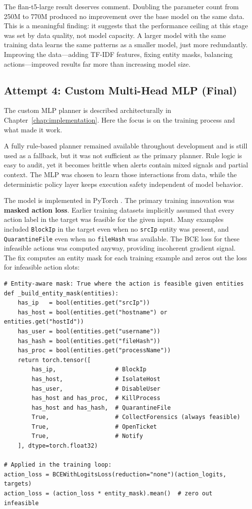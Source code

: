 The flan-t5-large result deserves comment. Doubling the parameter count from 250M to 770M produced no improvement over the base model on the same data. This is a meaningful finding: it suggests that the performance ceiling at this stage was set by data quality, not model capacity. A larger model with the same training data learns the same patterns as a smaller model, just more redundantly. Improving the data---adding TF-IDF features, fixing entity masks, balancing actions---improved results far more than increasing model size.

\subsection{Attempt 4: Custom Multi-Head MLP (Final)}

The custom MLP planner is described architecturally in Chapter~\ref{chap:implementation}. Here the focus is on the training process and what made it work.

A fully rule-based planner remained available throughout development and is still used as
a fallback, but it was not sufficient as the primary planner. Rule logic is easy to
audit, yet it becomes brittle when alerts contain mixed signals and partial context. The
MLP was chosen to learn those interactions from data, while the deterministic policy layer
keeps execution safety independent of model behavior.

The model is implemented in PyTorch \cite{paszke2019pytorch}. The primary training innovation was \textbf{masked action loss}. Earlier training datasets implicitly assumed that every action label in the target was feasible for the given input. Many examples included \texttt{BlockIp} in the target even when no \texttt{srcIp} entity was present, and \texttt{QuarantineFile} even when no \texttt{fileHash} was available. The BCE loss for these infeasible actions was computed anyway, providing incoherent gradient signal. The fix computes an entity mask for each training example and zeros out the loss for infeasible action slots:

\begin{verbatim}
# Entity-aware mask: True where the action is feasible given entities
def _build_entity_mask(entities):
    has_ip   = bool(entities.get("srcIp"))
    has_host = bool(entities.get("hostname") or entities.get("hostId"))
    has_user = bool(entities.get("username"))
    has_hash = bool(entities.get("fileHash"))
    has_proc = bool(entities.get("processName"))
    return torch.tensor([
        has_ip,                 # BlockIp
        has_host,               # IsolateHost
        has_user,               # DisableUser
        has_host and has_proc,  # KillProcess
        has_host and has_hash,  # QuarantineFile
        True,                   # CollectForensics (always feasible)
        True,                   # OpenTicket
        True,                   # Notify
    ], dtype=torch.float32)

# Applied in the training loop:
action_loss = BCEWithLogitsLoss(reduction="none")(action_logits, targets)
action_loss = (action_loss * entity_mask).mean()  # zero out infeasible
\end{verbatim}

